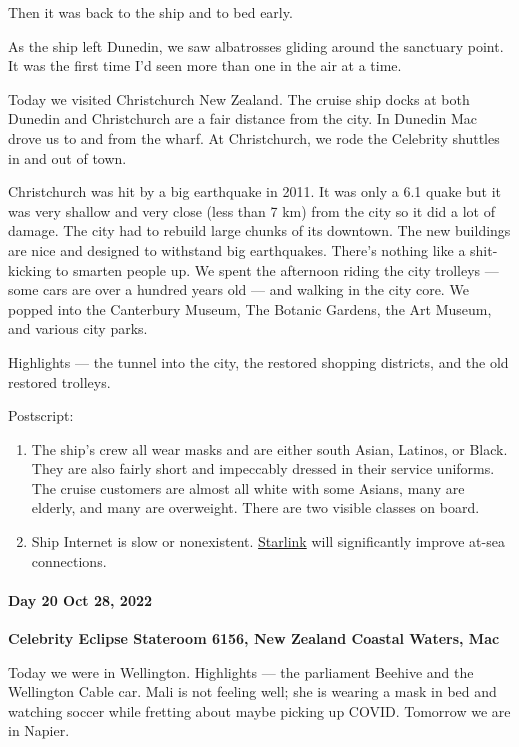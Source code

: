 Then it was back to the ship and to bed early.

As the ship left Dunedin, we saw albatrosses gliding around the
sanctuary point. It was the first time I'd seen more than one in the air
at a time.

Today we visited Christchurch New Zealand. The cruise ship docks at both
Dunedin and Christchurch are a fair distance from the city. In Dunedin
Mac drove us to and from the wharf. At Christchurch, we rode the
Celebrity shuttles in and out of town.

Christchurch was hit by a big earthquake in 2011. It was only a 6.1
quake but it was very shallow and very close (less than 7 km) from the
city so it did a lot of damage. The city had to rebuild large chunks of
its downtown. The new buildings are nice and designed to withstand big
earthquakes. There's nothing like a shit-kicking to smarten people up.
We spent the afternoon riding the city trolleys --- some cars are over a
hundred years old --- and walking in the city core. We popped into the
Canterbury Museum, The Botanic Gardens, the Art Museum, and various city
parks.

Highlights --- the tunnel into the city, the restored shopping
districts, and the old restored trolleys.

Postscript:

\begin{enumerate}
\def\labelenumi{\arabic{enumi}.}
\item
  The ship's crew all wear masks and are either south Asian, Latinos, or
  Black. They are also fairly short and impeccably dressed in their
  service uniforms. The cruise customers are almost all white with some
  Asians, many are elderly, and many are overweight. There are two
  visible classes on board.
\item
  Ship Internet is slow or nonexistent.
  \href{https://www.starlink.com/}{Starlink} will significantly improve
  at-sea connections.
\end{enumerate}

\hypertarget{day-20-oct-28-2022}{%
\paragraph{\texorpdfstring{\textbf{Day 20 Oct 28, 2022}}{Day 20 Oct 28, 2022}}\label{day-20-oct-28-2022}}

\textbf{Celebrity Eclipse Stateroom 6156, New Zealand Coastal Waters, Mac}

Today we were in Wellington. Highlights --- the parliament Beehive and
the Wellington Cable car. Mali is not feeling well; she is wearing a
mask in bed and watching soccer while fretting about maybe picking up
COVID. Tomorrow we are in Napier.

